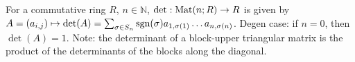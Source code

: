 For a commutative ring $R$, $n \in \mathbb{N}$,
$\det : \text{Mat}(n; R) \to R$ is given by
$A = (a_{i,j}) \mapsto \det(A) = \sum_{\sigma \in S_n} \text{sgn}(\sigma) a_{1, \sigma(1)} \dots a_{n, \sigma(n)}$.
Degen case: if $n = 0$, then $\det(A) = 1$.
Note: the determinant of a block-upper triangular matrix
is the product of the determinants of the blocks along the diagonal.
